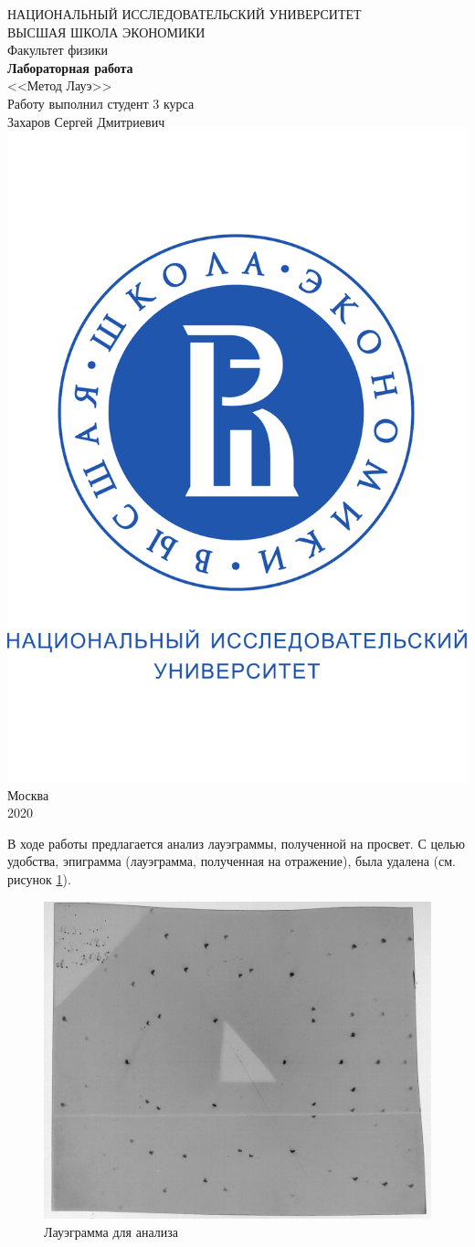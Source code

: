 \documentclass[a4paper, 12pt]{article}
\begin{document}
	\begin{titlepage}
		\begin{center}
			$$$$
			$$$$
			$$$$
			$$$$
			{\Large{НАЦИОНАЛЬНЫЙ ИССЛЕДОВАТЕЛЬСКИЙ УНИВЕРСИТЕТ}}\\
			\vspace{0.1cm}
			{\Large{ВЫСШАЯ ШКОЛА ЭКОНОМИКИ}}\\
			\vspace{0.25cm}
			{\large{Факультет физики}}\\
			\vspace{4cm}
			{\Huge\textbf{{Лабораторная работа}}}\\%
			\vspace{1cm}
			{\LARGE{<<Метод Лауэ>>}}\\%
			\vspace{2cm}
			{Работу выполнил студент 3 курса}\\
			{Захаров Сергей Дмитриевич}
			\vfill
			\includegraphics[width=0.2\linewidth]{HSElogo}
			\vfill
			Москва\\
			2020
		\end{center}
	\end{titlepage}

В ходе работы предлагается анализ лауэграммы, полученной на просвет. С целью удобства, эпиграмма (лауэграмма, полученная на отражение), была удалена (см. рисунок \ref{fig:incoming}).

\begin{figure}[H]
	\centering
	\includegraphics[width=0.7\linewidth]{incoming}
	\caption{Лауэграмма для анализа}
	\label{fig:incoming}
\end{figure}
\end{document}
